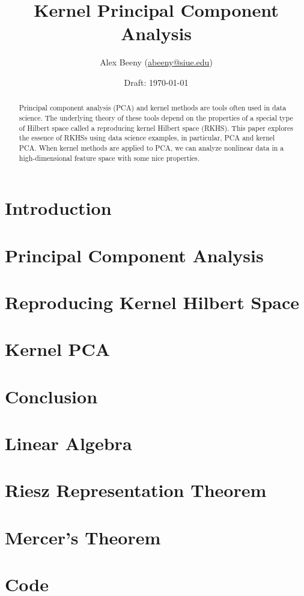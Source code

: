 \documentclass{article}
\title{Kernel Principal Component Analysis}
\author{Alex Beeny (\url{abeeny@siue.edu})}
\date{Draft: \today}
\theoremstyle{definition}
\begin{document}
\maketitle
\tableofcontents
\begin{abstract}
    Principal component analysis (PCA) and kernel methods are tools often used in data science.
    The underlying theory of these tools depend on the properties of a special type of Hilbert space called a reproducing kernel Hilbert space (RKHS).
    This paper explores the essence of RKHSs using data science examples, in particular, PCA and kernel PCA.
    When kernel methods are applied to PCA, we can analyze nonlinear data in a high-dimensional feature space with some nice properties.
\end{abstract}
\section{Introduction}

\section{Principal Component Analysis}

\section{Reproducing Kernel Hilbert Space}

\section{Kernel PCA}

\section{Conclusion}

\appendix
\section{Linear Algebra}

\section{Riesz Representation Theorem}

\section{Mercer's Theorem}

\section{Code}


\nocite{*}


\end{document}
